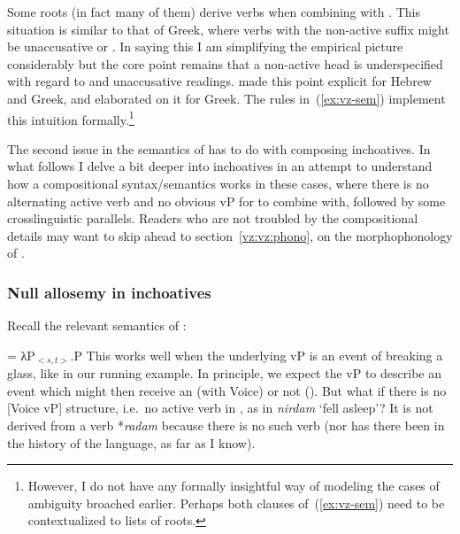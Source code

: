 \begin{exe}
\begin{xlist}
\begin{xlist}
\begin{exe}
\begin{xlist}
\begin{xlist}
\begin{exe}
\begin{xlist}
\begin{xlist}
\begin{exe}
\begin{exe}
\begin{xlist}
\begin{exe}
\begin{exe}
\begin{xlist}
\begin{exe}
\begin{exe}
\begin{exe}
\begin{exe}
\begin{exe}
\begin{xlist}
\begin{exe}
\begin{xlist}
\begin{exe}
\begin{exe}
\begin{xlist}
\begin{exe}
\begin{xlist}
\begin{exe}
\begin{xlist}
\begin{exe}
\begin{exe}
\begin{exe}
\begin{xlist}
Some roots (in fact many of them) derive  verbs when combining with {\tnif}. This situation is similar to that of Greek, where verbs with the non-active suffix might be unaccusative or . In saying this I am simplifying the empirical picture considerably but the core point remains that a non-active head is underspecified with regard to  and unaccusative readings. \cite{alexiadoudoron12} made this point explicit for Hebrew and Greek, and \cite{layering15} elaborated on it for Greek. The rules in~(\ref{ex:vz-sem}) implement this intuition formally.\footnote{However, I do not have any formally insightful way of modeling the cases of ambiguity broached earlier. Perhaps both clauses of~(\ref{ex:vz-sem}) need to be contextualized to lists of roots.}

The second issue in the semantics of {\vz} has to do with composing inchoatives. In what follows I delve a bit deeper into inchoatives in an attempt to understand how a compositional syntax/semantics works in these cases, where there is no alternating active verb and no obvious vP for {\vz} to combine with, followed by some crosslinguistic parallels. Readers who are not troubled by the compositional details may want to skip ahead to section~\ref{vz:vz:phono}, on the morphophonology of {\vz}.

\subsubsection{Null allosemy in inchoatives} \label{vz:inch:analysis}
Recall the relevant semantics of {\vz}:
 \begin{exe}
\ex  \denote{\vz} = λP$_{<s,t>}$.P
 \z 
This works well when the underlying vP is an event of breaking a glass, like in our running example. In principle, we expect the vP to describe an event which might then receive an  (with Voice) or not ({\vz}). But what if there is no [Voice vP] structure, i.e.~no active verb in {\tkal}, as in \emph{nirdam} `fell asleep'? It is not derived from a  verb *\emph{radam} because there is no such verb (nor has there been in the history of the language, as far as I know).


\end{exe}
\end{xlist}
\end{exe}
\end{exe}
\end{exe}
\end{xlist}
\end{exe}
\end{xlist}
\end{exe}
\end{xlist}
\end{exe}
\end{exe}
\end{xlist}
\end{exe}
\end{xlist}
\end{exe}
\end{exe}
\end{exe}
\end{exe}
\end{exe}
\end{xlist}
\end{exe}
\end{exe}
\end{xlist}
\end{exe}
\end{exe}
\end{xlist}
\end{xlist}
\end{exe}
\end{xlist}
\end{xlist}
\end{exe}
\end{xlist}
\end{xlist}
\end{exe}
